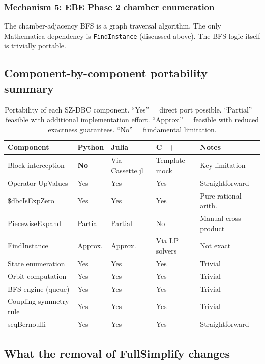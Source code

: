 \documentclass[12pt,a4paper]{article}
\theoremstyle{critical}
\theoremstyle{remark}
\theoremstyle{verified}
\begin{document}
\subsubsection{Mechanism 5: EBE Phase 2 chamber enumeration}

The chamber-adjacency BFS is a graph traversal algorithm.  The only Mathematica
dependency is \texttt{FindInstance} (discussed above).  The BFS logic itself is
trivially portable.

\subsection{Component-by-component portability summary}

\begin{table}[h!]
\centering
\begin{tabular}{lllll}
\toprule
\textbf{Component} & \textbf{Python} & \textbf{Julia} & \textbf{C++} & \textbf{Notes} \\
\midrule
Block interception & \textbf{No} & Via Cassette.jl & Template mock & Key limitation \\
Operator UpValues & Yes & Yes & Yes & Straightforward \\
\$dbcIsExpZero & Yes & Yes & Yes & Pure rational arith. \\
PiecewiseExpand & Partial & Partial & No & Manual cross-product \\
FindInstance & Approx. & Approx. & Via LP solvers & Not exact \\
State enumeration & Yes & Yes & Yes & Trivial \\
Orbit computation & Yes & Yes & Yes & Trivial \\
BFS engine (queue) & Yes & Yes & Yes & Trivial \\
Coupling symmetry rule & Yes & Yes & Yes & Trivial \\
seqBernoulli & Yes & Yes & Yes & Straightforward \\
\bottomrule
\end{tabular}
\caption{Portability of each SZ-DBC component.  ``Yes'' = direct port possible.
``Partial'' = feasible with additional implementation effort.
``Approx.'' = feasible with reduced exactness guarantees.
``No'' = fundamental limitation.}
\end{table}

\subsection{What the removal of FullSimplify changes}
\end{document}

